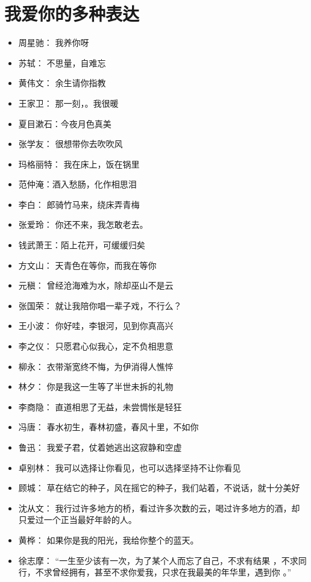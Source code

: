 \documentclass[UTF8,a4paper,8pt]{ctexbook}
\begin{document}
\section{我爱你的多种表达}
	\begin{itemize}
		\item 周星驰： 我养你呀
		\item 苏轼： 不思量，自难忘
		\item 黄伟文： 余生请你指教
		\item 王家卫： 那一刻，。我很暖
		\item 夏目漱石：今夜月色真美
		\item 张学友： 很想带你去吹吹风
		\item 玛格丽特： 我在床上，饭在锅里
		\item 范仲淹：酒入愁肠，化作相思泪
		\item 李白： 郎骑竹马来，绕床弄青梅
		\item 张爱玲： 你还不来，我怎敢老去。
		\item 钱武萧王：陌上花开，可缓缓归矣
		\item 方文山： 天青色在等你，而我在等你
		\item 元稹： 曾经沧海难为水，除却巫山不是云
		\item 张国荣： 就让我陪你唱一辈子戏，不行么？
		\item 王小波： 你好哇，李银河，见到你真高兴
		\item 李之仪： 只愿君心似我心，定不负相思意
		\item 柳永： 衣带渐宽终不悔，为伊消得人憔悴
		\item 林夕： 你是我这一生等了半世未拆的礼物
		\item 李商隐： 直道相思了无益，未尝惆怅是轻狂
		\item 冯唐： 春水初生，春林初盛，春风十里，不如你
		\item 鲁迅： 我爱子君，仗着她逃出这寂静和空虚
		\item 卓别林： 我可以选择让你看见，也可以选择坚持不让你看见
		\item 顾城： 草在结它的种子，风在摇它的种子，我们站着，不说话，就十分美好
		\item 沈从文： 我行过许多地方的桥，看过许多次数的云，喝过许多地方的酒，却只爱过一个正当最好年龄的人。
		\item 黄桦： 如果你是我的阳光，我给你整个的蓝天。
		\item 徐志摩： “一生至少该有一次，为了某个人而忘了自己，不求有结果 ，不求同行，不求曾经拥有，甚至不求你爱我，只求在我最美的年华里，遇到你 。”
	\end{itemize}
	
\end{document}
